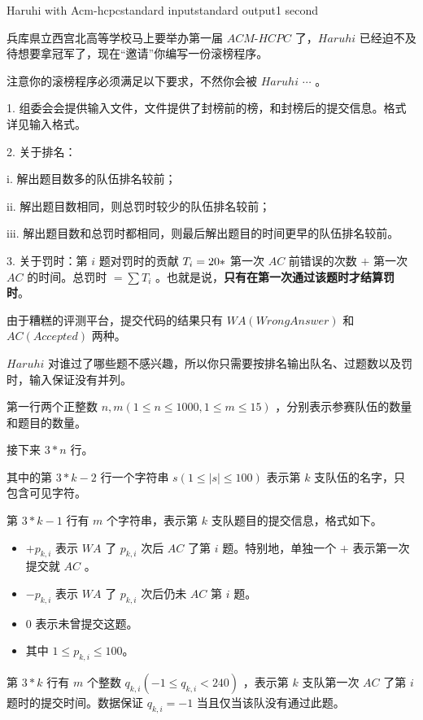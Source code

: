 \begin{problem}{Haruhi with Acm-hcpc}{standard input}{standard output}{1 second}

兵库県立西宫北高等学校马上要举办第一届 $ACM$-$HCPC$ 了，$Haruhi$ 已经迫不及待想要拿冠军了，现在“邀请”你编写一份滚榜程序。

注意你的滚榜程序必须满足以下要求，不然你会被 $Haruhi$ $\cdots$ 。

1.  组委会会提供输入文件，文件提供了封榜前的榜，和封榜后的提交信息。格式详见输入格式。

2.  关于排名：

\qquad i. 解出题目数多的队伍排名较前；

\qquad ii. 解出题目数相同，则总罚时较少的队伍排名较前；

\qquad iii. 解出题目数和总罚时都相同，则最后解出题目的时间更早的队伍排名较前。

3.  关于罚时：第 $i$ 题对罚时的贡献 $T_{i}=20\space *$ 第一次 $AC$ 前错误的次数 $+$ 第一次 $AC$ 的时间。总罚时 $=\sum T_{i}$ 。也就是说，\textbf{只有在第一次通过该题时才结算罚时}。

由于糟糕的评测平台，提交代码的结果只有 $WA(WrongAnswer)$ 和 $AC(Accepted) $ 两种。

$Haruhi$ 对谁过了哪些题不感兴趣，所以你只需要按排名输出队名、过题数以及罚时，输入保证没有并列。

\InputFile

第一行两个正整数 $n,m(1 \leq n \leq 1000,1 \leq m \leq 15)$ ，分别表示参赛队伍的数量和题目的数量。

接下来 $3*n$ 行。

其中的第 $3*k-2$ 行一个字符串 $s(1 \leq |s| \leq 100)$ 表示第 $k$ 支队伍的名字，只包含可见字符。 

第 $3*k-1$ 行有 $m$ 个字符串，表示第 $k$ 支队题目的提交信息，格式如下。

\begin{itemize}
\item $+p_{k,i}$ 表示 $WA$ 了 $p_{k,i}$ 次后 $AC$ 了第 $i$ 题。特别地，单独一个 $+$ 表示第一次提交就 $AC$ 。
\item $-p_{k,i}$ 表示 $WA$ 了 $p_{k,i}$ 次后仍未 $AC$ 第 $i$ 题。
\item  $0$ 表示未曾提交这题。
\item  其中 $1 \leq p_{k,i} \leq 100$。
\end{itemize}

第 $3*k$ 行有 $m$ 个整数 $q_{k,i}(-1 \leq q_{k,i} \lt 240)$ ，表示第 $k$ 支队第一次 $AC$ 了第 $i$ 题时的提交时间。数据保证 $q_{k,i}=-1$ 当且仅当该队没有通过此题。


\end{problem}
